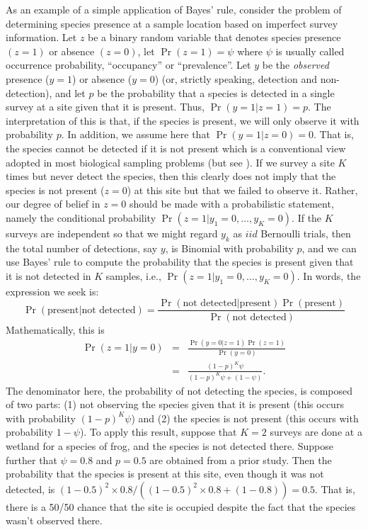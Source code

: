 As an example of a simple application of Bayes' rule,
consider the problem of determining species presence at a sample
location based on imperfect survey information. Let $z$ be a binary
random variable that denotes species presence $(z=1)$ or absence
$(z=0)$, let $\Pr(z=1) = \psi$ where $\psi$ is usually called
occurrence probability, ``occupancy'' \citep{mackenzie_etal:2002} or ``prevalence''.
Let $y$ be the {\it observed} presence
($y=1$) or absence ($y=0$) (or, strictly speaking, detection and non-detection), and let $p$ be the probability that a
species is detected in a single survey at a site given that it is
present. Thus, $\Pr(y=1|z=1)=p$. The interpretation of this is that,
if the species is present, we will only observe it with
probability $p$. In addition, we assume here that $\Pr(y=1|z=0) =
0$. That is, the species cannot be detected if it is not present which
is a conventional view adopted in most biological sampling problems (but
see \citet{royle_link:2006}).
If we survey a site $K$ times but never detect the species,
then this clearly does not imply that the species is not present
($z=0$) at this site but that we failed to observe it. 
Rather, our degree of belief in $z=0$ should be
made with a probabilistic statement, namely the conditional probability
$\Pr(z=1|y_1=0,\ldots,y_{K}=0)$. If the $K$ surveys are independent so
that we might regard $y_{k}$ as $iid$ Bernoulli trials, then the total
number of detections, say $y$, is Binomial with probability $p$, and
we can use Bayes' rule to compute the probability that the species is present
given that it is not detected in $K$ samples, i.e., $\Pr(z=1|y_{1} =
0, \ldots, y_{K} = 0)$. In words, the expression
we seek is:
\[
\Pr(\mbox{present} | \mbox{not detected}) = \frac{\Pr(\mbox{not detected} |
  \mbox{present})\Pr(\mbox{present})}{\Pr(\mbox{not detected})}
\]
Mathematically, this is
\begin{eqnarray*}
\Pr(z=1|y=0) &= &\frac{\Pr(y=0|z=1)\Pr(z=1)}{\Pr(y=0) } \\
             &= & \frac{(1-p)^{K} \psi}{ (1-p)^K \psi + (1-\psi) }.
\end{eqnarray*}
The denominator here, 
the probability of not detecting the species, 
is composed of two parts: (1) not observing the species given that it
is present (this occurs with probability $(1-p)^{K} \psi$) and (2) the
species is not present (this occurs with probability $1-\psi$).
To apply this result,
suppose that $K=2$ surveys are done at a wetland for a species of
frog, and the species is not detected there. Suppose further that $\psi
= 0.8$ and $p = 0.5$ are obtained from a prior study.  Then the
probability that the species is present at this site, even though it
was not detected, is
$(1-0.5)^2 \times 0.8/((1-0.5)^2 \times 0.8 + (1-0.8)) = 0.5$. 
That is, there is a
50/50 chance that the site is occupied despite the fact that the
species wasn't observed there.

